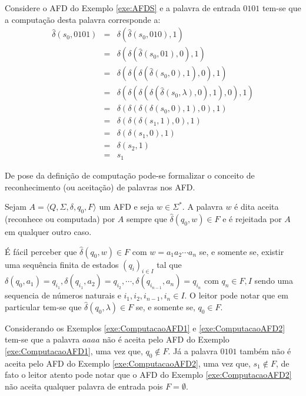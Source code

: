 \begin{example}\label{exe:ComputacaoAFD2}
	Considere o AFD do Exemplo \ref{exe:AFDS} e a palavra de entrada $0101$ tem-se que a computação desta palavra corresponde a:
	\begin{eqnarray*}
		\widehat{\delta}(s_0, 0101) & = & \delta(\widehat{\delta}(s_0, 010), 1)\\
		& = & \delta(\delta(\widehat{\delta}(s_0, 01), 0), 1)\\
		& = & \delta(\delta(\delta(\widehat{\delta}(s_0, 0), 1), 0), 1)\\
		& = & \delta(\delta(\delta(\delta(\widehat{\delta}(s_0, \lambda), 0), 1), 0), 1)\\
		& = & \delta(\delta(\delta(\delta(s_0, 0), 1), 0), 1)\\
		& = & \delta(\delta(\delta(s_1, 1), 0), 1)\\
		& = & \delta(\delta(s_1, 0), 1)\\
		& = & \delta(s_2, 1)\\
		& = & s_1
	\end{eqnarray*}
\end{example}

De pose da definição de computação pode-se formalizar o conceito de reconhecimento (ou aceitação) de palavras nos AFD.

\begin{definition}\label{defi:PalavraAceitaPorAFD}
	\cite{benjaLivro2010} Sejam $A = \langle Q, \Sigma, \delta, q_0, F\rangle$ um AFD e seja $w \in \Sigma^*$. A palavra $w$ é dita aceita (reconhece ou computada) por $A$ sempre que $\widehat{\delta}(q_0, w) \in F$ e é rejeitada por $A$ em qualquer outro caso.
\end{definition}

É fácil perceber que $\widehat{\delta}(q_0, w) \in F$ com $w = a_1a_2\cdots a_n$ se, e somente se, existir uma sequência finita de estados $(q_i)_{i \in I}$ tal que $\delta(q_0, a_1) = q_{i_1}, \delta(q_{i_1}, a_2) = q_{i_2}, \cdots, \delta(q_{i_{n-1}}, a_{n}) = q_{i_n}$ com $q_n \in F, I$ sendo uma sequencia de números naturais e $i_1, i_2, i_{n-1}, i_n \in I$. O leitor pode notar que em particular tem-se que $\widehat{\delta}(q_0, \lambda) \in F$ se, e somente se, $q_0 \in F$.

\begin{example}\label{exe:AceiteAFD1}
	Considerando os Exemplos \ref{exe:ComputacaoAFD1} e \ref{exe:ComputacaoAFD2} tem-se que a palavra $aaaa$ não é aceita pelo AFD do Exemplo \ref{exe:ComputacaoAFD1}, uma vez que, $q_0 \notin F$. Já a palavra $0101$ também não é aceita pelo AFD do Exemplo \ref{exe:ComputacaoAFD2}, uma vez que, $s_1 \notin F$, de fato o leitor atento pode notar que o AFD do Exemplo \ref{exe:ComputacaoAFD2} não aceita qualquer palavra de entrada pois $F = \emptyset$.
\end{example}

